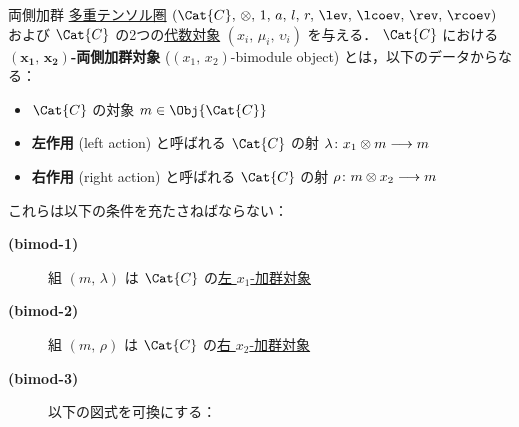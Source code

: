 \documentclass[TQFT_main]{subfiles}
\begin{document}
\begin{mydef}[label=def:bimodobj,breakable]{両側加群}
    \hyperref[def:tensorfusion-cat]{多重テンソル圏} $(\Cat{C},\, \otimes,\, 1,\, a,\, l,\, r,\, \lev,\, \lcoev,\, \rev,\, \rcoev)$ 
    および $\Cat{C}$ の2つの\hyperref[def:algobj]{代数対象} $(x_i,\, \mu_i,\, \upsilon_i)$ を与える．
    $\Cat{C}$ における\textbf{$(\bm{x_1},\, \bm{x_2})$-両側加群対象} ($(x_1,\, x_2)$-bimodule object) とは，以下のデータからなる：
    \begin{itemize}
        \item $\Cat{C}$ の対象 $m \in \Obj{\Cat{C}}$ 
        \item \textbf{左作用} (left action) と呼ばれる $\Cat{C}$ の射 $\lambda \colon x_1 \otimes m \longrightarrow m$
        \item \textbf{右作用} (right action) と呼ばれる $\Cat{C}$ の射 $\rho \colon m \otimes x_2 \longrightarrow m$
    \end{itemize}
    これらは以下の条件を充たさねばならない：
    \begin{description}
        \item[\textbf{(bimod-1)}] 組 $(m,\, \lambda)$ は $\Cat{C}$ の\hyperref[def:moduleobj]{左 $x_1$-加群対象}
        \item[\textbf{(bimod-2)}] 組 $(m,\, \rho)$ は $\Cat{C}$ の\hyperref[def:moduleobj]{右 $x_2$-加群対象}
        \item[\textbf{(bimod-3)}] 以下の図式を可換にする：
        
        \begin{center}
        \end{center}
    \end{description}
    
\end{mydef}
\end{document}
